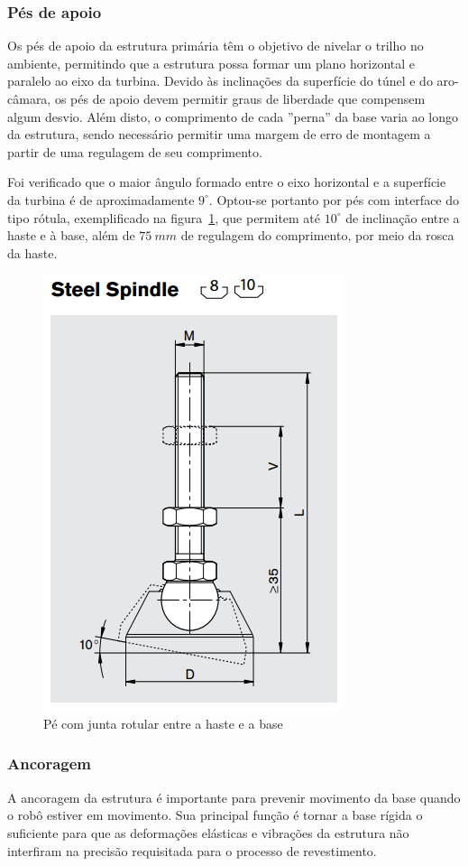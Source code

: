 \subsubsection{Pés de apoio}

Os pés de apoio da estrutura primária têm o objetivo de nivelar o trilho no
ambiente, permitindo que a estrutura possa formar um plano horizontal e paralelo
ao eixo da turbina. Devido às inclinações da superfície do túnel e do
aro-câmara, os pés de apoio devem permitir graus de liberdade que compensem
algum desvio. Além disto, o comprimento de cada ''perna'' da base varia ao
longo da estrutura, sendo necessário permitir uma margem de erro de
montagem a partir de uma regulagem de seu comprimento.

Foi verificado que o maior ângulo formado entre o eixo horizontal e a superfície
da turbina é de aproximadamente $9^{\circ}$. Optou-se portanto por pés com
interface do tipo rótula, exemplificado na figura~\ref{fig::spindle}, que
permitem até $10^{\circ}$ de inclinação entre a haste e à base, além de $75~mm$ de regulagem
do comprimento, por meio da rosca da haste. %

\begin{figure}[h!]
	\centering
	\includegraphics[width=0.4\columnwidth]{method/figs/construcao/spindle}
	\caption{Pé com junta rotular entre a haste e a base}
    \label{fig::spindle}
\end{figure}

\subsubsection{Ancoragem}

A ancoragem da estrutura é importante para prevenir movimento da base quando o
robô estiver em movimento. Sua principal função é tornar a base rígida o
suficiente para que as deformações elásticas e vibrações da estrutura não
interfiram na precisão requisitada para o processo de revestimento.

